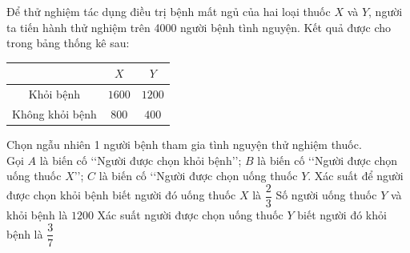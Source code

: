 \begin{ex}%
	Để thử nghiệm tác dụng điều trị bệnh mất ngủ của hai loại thuốc $X$ và $Y$, người ta tiến hành thử nghiệm trên 4000 người bệnh tình nguyện. Kết quả được cho trong bảng thống kê sau:
	\begin{center}
		\begin{tabular}{|c|c|c|}
			\hline \diagbox{Kết quả}{Dùng thuốc}&$X$ & $Y$\\
			\hline Khỏi bệnh & $1600$ & $1200$\\
			\hline Không khỏi bệnh & $800$ & $400$\\
			\hline 
		\end{tabular}
	\end{center}
	Chọn ngẫu nhiên 1 người bệnh tham gia tình nguyện thử nghiệm thuốc.\\
	Gọi $A$ là biến cố \lq\lq Người được chọn khỏi bệnh\rq\rq; $B$ là biến cố \lq\lq Người được chọn uống thuốc $X$\rq\rq; $C$ là biến cố \lq\lq Người được chọn uống thuốc $Y$.
	{\True Xác suất để người được chọn khỏi bệnh biết người đó uống thuốc $X$ là $\dfrac{2}{3}$}
	{\True Số người uống thuốc $Y$ và khỏi bệnh là $1200$}
	{\True Xác suất người được chọn uống thuốc $Y$ biết người đó khỏi bệnh là $\dfrac{3}{7}$}
\end{ex}

